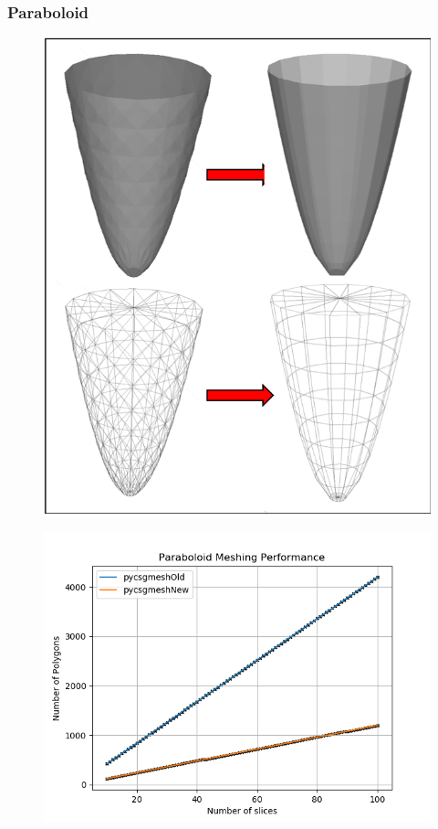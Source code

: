 \documentclass[12pt,a4paper]{article}
\begin{document}
\subsubsection{Paraboloid}

\begin{figure}[h!]
\centering
\begin{minipage}{.2\textwidth}
  \centering
  \includegraphics[height=1\linewidth]{Images//Meshes//paraboloid.png}
  \label{fig:test1}
\end{minipage}%
\begin{minipage}{.3\textwidth}
  \centering
  \includegraphics[scale=0.35]{Images//Quad_fits//Paraboloid_quad.png}
  \label{fig:test2}
\end{minipage}%
\end{figure}
\end{document}
